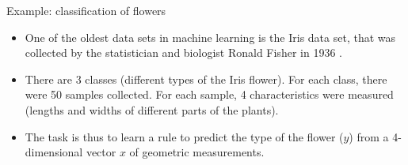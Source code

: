 \documentclass[xcolor=pdftex,dvipsnames,table]{beamer}
\begin{document}
\begin{frame}{Example: classification of flowers}
\begin{figure}
  \centering
  \qquad
  \qquad
  \qquad
  \label{fig:Iris_data_set}
\end{figure}
\begin{itemize}
	\item One of the oldest data sets in machine learning is the Iris data set, that was collected by the statistician and biologist Ronald Fisher in 1936 \cite{Fisher1936}.
	\item There are 3 classes (different types of the Iris flower). For each class, there were 50 samples collected. For each sample, 4 characteristics were measured (lengths and widths of different parts of the plants).
	\item The task is thus to learn a rule to predict the type of the flower ($y$) from a 4-dimensional vector $x$ of geometric measurements.
\end{itemize}
\end{frame}
\end{document}

